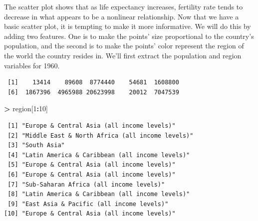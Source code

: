 \documentclass[]{krantz}
\makeatletter
\newenvironment{Shaded}{\begin{snugshade}}{\end{snugshade}}
\newcommand{\DecValTok}[1]{\textcolor[rgb]{0.06,0.06,0.06}{#1}}
\newcommand{\NormalTok}[1]{#1}
\newcommand{\OperatorTok}[1]{\textcolor[rgb]{0.43,0.43,0.43}{\textbf{#1}}}
\newcommand{\StringTok}[1]{\textcolor[rgb]{0.5,0.5,0.5}{#1}}
\newenvironment{kframe}{%
\medskip{}
\setlength{\fboxsep}{.8em}
 \def\at@end@of@kframe{}%
 \ifinner\ifhmode%
  \def\at@end@of@kframe{\end{minipage}}%
  \begin{minipage}{\columnwidth}%
 \fi\fi%
 \def\FrameCommand##1{\hskip\@totalleftmargin \hskip-\fboxsep
 \colorbox{shadecolor}{##1}\hskip-\fboxsep
     \hskip-\linewidth \hskip-\@totalleftmargin \hskip\columnwidth}%
 \MakeFramed {\advance\hsize-\width
   \@totalleftmargin\z@ \linewidth\hsize
   \@setminipage}}%
 {\par\unskip\endMakeFramed%
 \at@end@of@kframe}
\renewenvironment{Shaded}{\begin{kframe}}{\end{kframe}}
\makeatother
\begin{document}
The scatter plot shows that as life expectancy increases, fertility rate tends to decrease in what appears to be a nonlinear relationship. Now that we have a basic scatter plot, it is tempting to make it more informative. We will do this by adding two features. One is to make the points' size proportional to the country's population, and the second is to make the points' color represent the region of the world the country resides in. We'll first extract the population and region variables for 1960.

\begin{Shaded}
\end{Shaded}

\begin{verbatim}
 [1]    13414    89608  8774440    54681  1608800
 [6]  1867396  4965988 20623998    20012  7047539
\end{verbatim}

\begin{Shaded}
\begin{Highlighting}[]
\OperatorTok{>}\StringTok{ }\NormalTok{region[}\DecValTok{1}\OperatorTok{:}\DecValTok{10}\NormalTok{]}
\end{Highlighting}
\end{Shaded}

\begin{verbatim}
 [1] "Europe & Central Asia (all income levels)"     
 [2] "Middle East & North Africa (all income levels)"
 [3] "South Asia"                                    
 [4] "Latin America & Caribbean (all income levels)" 
 [5] "Europe & Central Asia (all income levels)"     
 [6] "Europe & Central Asia (all income levels)"     
 [7] "Sub-Saharan Africa (all income levels)"        
 [8] "Latin America & Caribbean (all income levels)" 
 [9] "East Asia & Pacific (all income levels)"       
[10] "Europe & Central Asia (all income levels)"     
\end{verbatim}
\end{document}
